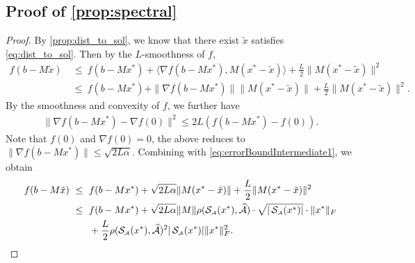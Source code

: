 \subsection{Proof of \autoref{prop:spectral}}
\begin{proof}
  By \autoref{prop:dist_to_sol}, we know that there exist $\tilde{x}$ satisfies \eqref{eq:dist_to_sol}.
  Then by the $L$-smoothness of $f$,
  \begin{align}
      f( b - M \tilde{x} ) &~\leq~ f( b - M x^* ) + \langle \nabla f( b - M x^* ), M( x^* - \tilde{x} ) \rangle + \frac{L}{2} \| M( x^* - \tilde{x} ) \|^2  \nonumber \\
      &~\leq~ f( b - M x^* ) + \| \nabla f( b - M x^* ) \| \| M( x^* - \tilde{x} ) \| + \frac{L}{2} \| M( x^* - \tilde{x} ) \|^2. \label{eq:errorBoundIntermediate1}
  \end{align}
  By the smoothness and convexity of $f$, we further have
  \begin{align*}
      \| \nabla f( b - M x^* ) - \nabla f(0) \|^2 \leq 2L ( f(b - M x^*) - f(0) ).
  \end{align*}
  Note that $f(0)$ and $\nabla f(0) = 0$, the above reduces to $\| \nabla f( b - M x^* ) \| \leq \sqrt{2 L \alpha}$. Combining with \eqref{eq:errorBoundIntermediate1}, we obtain
  \begin{align*}
      f( b - M \tilde{x} ) &~\leq~ f( b - M x^* ) + \sqrt{2 L \alpha} \| M( x^* - \tilde{x} ) \| + \frac{L}{2} \| M( x^* - \tilde{x} ) \|^2 \\
      &~\leq~ f( b - M x^* ) + \sqrt{2 L \alpha} \| M \| \rho( \operatorname{\mathcal{S}_{\scriptscriptstyle\mathcal{A}}}(x^*), \widehat{\mathcal{A}} )\cdot \sqrt{| \operatorname{\mathcal{S}_{\scriptscriptstyle\mathcal{A}}}(x^*) |} \cdot \| x^* \|_F  \\
      &\qquad + \frac{L}{2} \rho( \operatorname{\mathcal{S}_{\scriptscriptstyle\mathcal{A}}}(x^*), \widehat{\mathcal{A}} )^2 | \operatorname{\mathcal{S}_{\scriptscriptstyle\mathcal{A}}}(x^*) | \| x^* \|_F^2.
  \end{align*}
\end{proof}
























